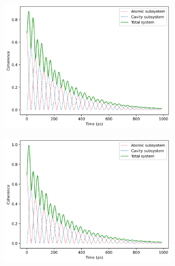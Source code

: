 \documentclass[12pt]{article}
\begin{document}
\begin{figure}[H]
    \centering
    \begin{subfigure}{0.45\textwidth}
        \centering
        \includegraphics[width=0.85\linewidth]{Research Project/Code/results/JCM/OQS_Coh_Spont_eg.png}
        \caption{}
        \label{fig:JCM_OQS_Coh_Spont_eg}
    \end{subfigure}
    \hfill
    \begin{subfigure}{0.45\textwidth}
        \centering
        \includegraphics[width=0.85\linewidth]{Research Project/Code/results/JCM/OQS_Coh_Therm_eg.png}
        \caption{}
        \label{fig:JCM_OQS_Coh_Therm_eg}
    \end{subfigure}
    
    \vspace{0.5cm}
    

\end{figure}
\end{document}
